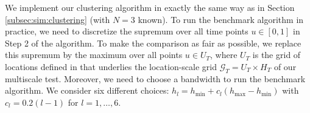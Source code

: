 \documentclass[12pt]{article}
\makeatletter
\renewcommand{\eqref}[1]{\tagform@{\ref{#1}}}
\makeatother
\begin{document}
We implement our clustering algorithm in exactly the same way as in Section \ref{subsec:sim:clustering} (with $N=3$ known). To run the benchmark algorithm in practice, we need to discretize the supremum over all time points $u \in [0,1]$ in Step 2 of the algorithm. To make the comparison as fair as possible, we replace this supremum by the maximum over all points $u \in U_T$, where $U_T$ is the grid of locations defined in \eqref{eq:grid-loc} that underlies the location-scale grid $\mathcal{G}_T = U_T \times H_T$ of our multiscale test. Moreover, we need to choose a bandwidth to run the benchmark algorithm. We consider six different choices: $h_l = h_{\min} + c_l (h_{\max} - h_{\min})$ with $c_l = 0.2(l-1)$ for $l=1,\ldots,6$.



\begin{table}[t!]
\footnotesize{  
\begin{center}
\caption{Empirical probabilities that the estimated group structure is identical to the true group structure $\{ G_1,G_2,G_3\}$. $\mathcal{T}_{\text{MS}}$ denotes our multiscale method and $\mathcal{T}_{\text{bmk, }l}$ the benchmark procedure with bandwidth $h_l$ ($l=1,\ldots,6$). 
\textcolor{red}{[Can we delete $\mathcal{T}_{\text{MS, true lrv}}$? Not really needed in my opinion.]}}\label{tab:clustering:comparison}
\renewcommand{\arraystretch}{1.2}  

\end{center}}
\end{table}
\end{document}
